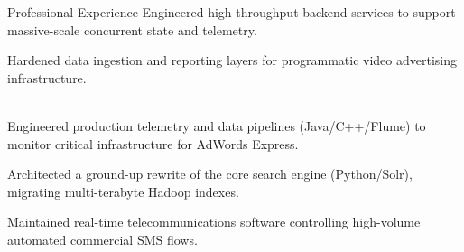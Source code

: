 \begin{rubric}{\color{ForestGreen} Professional Experience}
 Engineered high-throughput backend services to support massive-scale concurrent state and telemetry.

 Hardened data ingestion and reporting layers for programmatic video advertising infrastructure.

\\

 Engineered production telemetry and data pipelines (Java/C++/Flume) to monitor critical infrastructure for AdWords Express.

 Architected a ground-up rewrite of the core search engine (Python/Solr), migrating multi-terabyte Hadoop indexes.

 Maintained real-time telecommunications software controlling high-volume automated commercial SMS flows.
\end{rubric}
